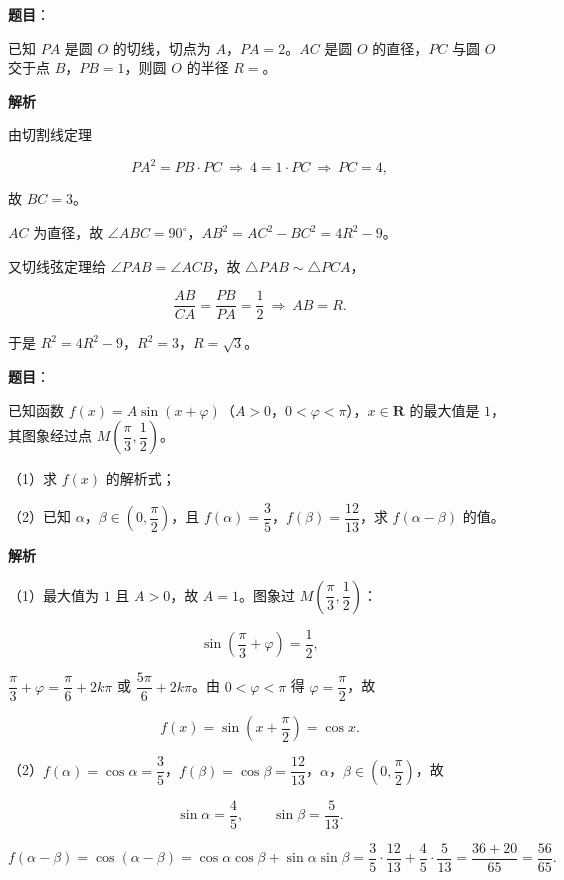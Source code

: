 \begin{answer}

\textbf{题目}：

已知 $PA$ 是圆 $O$ 的切线，切点为 $A$，$PA=2$。$AC$ 是圆 $O$ 的直径，$PC$ 与圆 $O$ 交于点 $B$，$PB=1$，则圆 $O$ 的半径 $R=$\gkblank{}。

\textbf{解析}

由切割线定理

\nopagebreak[4]
\[PA^2=PB\cdot PC\ \Longrightarrow\ 4=1\cdot PC\ \Longrightarrow\ PC=4,\]

故 $BC=3$。

$AC$ 为直径，故 $\angle ABC=90^\circ$，$AB^2=AC^2-BC^2=4R^2-9$。

又切线弦定理给 $\angle PAB=\angle ACB$，故 $\triangle PAB\sim\triangle PCA$，

\nopagebreak[4]
\[\frac{AB}{CA}=\frac{PB}{PA}=\frac12\ \Longrightarrow\ AB=R.\]

于是 $R^2=4R^2-9$，$R^2=3$，$R=\sqrt3$。


\end{answer}
\begin{answer}

\textbf{题目}：

已知函数 $f(x)=A\sin(x+\varphi)$（$A>0$，$0<\varphi<\pi$），$x\in\mathbf R$ 的最大值是 $1$，其图象经过点 $M\left(\dfrac{\pi}{3},\dfrac12\right)$。

（1）求 $f(x)$ 的解析式；

（2）已知 $\alpha$，$\beta\in\left(0,\dfrac{\pi}{2}\right)$，且 $f(\alpha)=\dfrac35$，$f(\beta)=\dfrac{12}{13}$，求 $f(\alpha-\beta)$ 的值。

\textbf{解析}

（1）最大值为 $1$ 且 $A>0$，故 $A=1$。图象过 $M\left(\dfrac{\pi}3,\dfrac12\right)$：

\nopagebreak[4]
\[\sin\left(\frac{\pi}3+\varphi\right)=\frac12,\]

$\dfrac{\pi}3+\varphi=\dfrac{\pi}6+2k\pi$ 或 $\dfrac{5\pi}6+2k\pi$。由 $0<\varphi<\pi$ 得 $\varphi=\dfrac{\pi}2$，故

\nopagebreak[4]
\[f(x)=\sin\left(x+\frac{\pi}2\right)=\cos x.\]

（2）$f(\alpha)=\cos\alpha=\dfrac35$，$f(\beta)=\cos\beta=\dfrac{12}{13}$，$\alpha$，$\beta\in\left(0,\dfrac{\pi}2\right)$，故

\nopagebreak[4]
\[\sin\alpha=\frac45,\qquad \sin\beta=\frac5{13}.\]

\nopagebreak[4]
\[f(\alpha-\beta)=\cos(\alpha-\beta)=\cos\alpha\cos\beta+\sin\alpha\sin\beta=\frac35\cdot\frac{12}{13}+\frac45\cdot\frac5{13}=\frac{36+20}{65}=\frac{56}{65}.\]


\end{answer}
